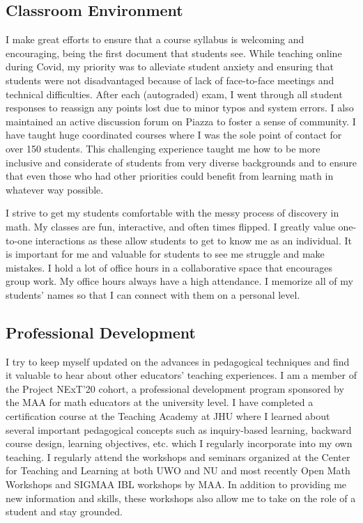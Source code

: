 \documentclass[10pt]{amsbook}
\begin{document}
\subsection*{Classroom Environment}
  I make great efforts to ensure that a course syllabus is welcoming and encouraging, being the first document that students see. 
  While teaching online during Covid, my priority was to alleviate student anxiety and ensuring that students were not disadvantaged because of lack of face-to-face meetings and technical difficulties. 
  After each (autograded) exam, I went through all student responses to reassign any points lost due to minor typos and system errors.
  I also maintained an active discussion forum on Piazza to foster a sense of community.
  I have taught huge coordinated courses where I was the sole point of contact for over 150 students.
  This challenging experience taught me how to be more inclusive and considerate of students from very diverse backgrounds and to ensure that even those who had other priorities could benefit from learning math in whatever way possible.

  I strive to get my students comfortable with the messy process of discovery in math.
  My classes are fun, interactive, and often times flipped.
  I greatly value one-to-one interactions as these allow students to get to know me as an individual.
  It is important for me and valuable for students to see me struggle and make mistakes. 
  I hold a lot of office hours in a collaborative space that encourages group work.
  My office hours always have a high attendance.
  I memorize all of my students' names so that I can connect with them on a personal level.

\subsection*{Professional Development}
  I try to keep myself updated on the advances in pedagogical techniques and find it valuable to hear about other educators' teaching experiences.
  I am a member of the Project NExT'20 cohort, a professional development program sponsored by the MAA for math educators at the university level.
  I have completed a certification course at the Teaching Academy at JHU where I learned about several important pedagogical concepts such as inquiry-based learning, backward course design, learning objectives, etc. which I regularly incorporate into my own teaching.
  I regularly attend the workshops and seminars organized at the Center for Teaching and Learning at both UWO and NU and most recently Open Math Workshops and SIGMAA IBL workshops by MAA.
  In addition to providing me new information and skills, these workshops also allow me to take on the role of a student and stay grounded.
\end{document}
